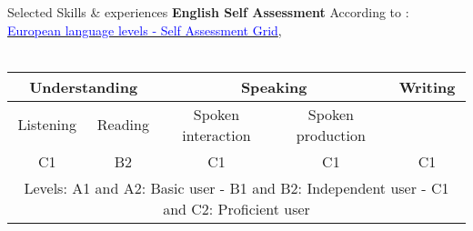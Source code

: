 \begin{rSection}{ Selected Skills \& experiences}
\textbf{English Self Assessment} According to : \href{https://europass.cedefop.europa.eu/resources/european-language-levels-cefr}{\textcolor{blue}{European language levels - Self Assessment Grid}},\\\\
\begin{tabular}{@{}|c|c|c|c|c@{}}
	\toprule
	\multicolumn{2}{|c|}{Understanding} & \multicolumn{2}{c|}{Speaking}          & Writing                 \\ \midrule
	Listening         & Reading         & Spoken interaction & Spoken production & \multicolumn{1}{c|}{}   \\ \midrule
	C1                & B2              & C1                 & C1                & \multicolumn{1}{c|}{C1} \\ \bottomrule
	\multicolumn{5}{c}{\tiny Levels: A1 and A2: Basic user - B1 and B2: Independent user - C1 and C2: Proficient user \normalfont }
\end{tabular}

\end{rSection}